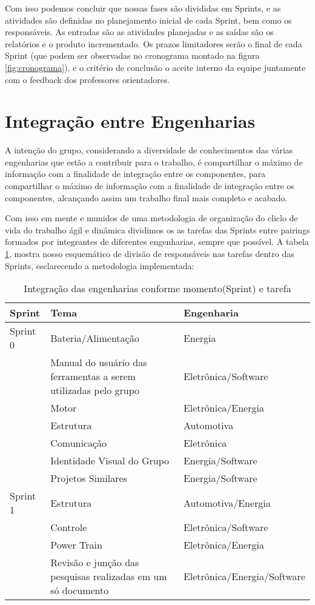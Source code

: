 Com isso podemos concluir que nossas fases são divididas em Sprints, e as atividades são definidas no planejamento inicial de cada Sprint, bem como os responsáveis. As entradas são as atividades planejadas e as saídas são os relatórios e o produto incrementado. Os prazos limitadores serão o final de cada Sprint (que podem ser observadas no cronograma montado na figura \ref{fig:cronograma}), e o critério de conclusão o aceite interno da equipe juntamente com o feedback dos professores orientadores.

\section{Integração entre Engenharias}

A intenção do grupo, considerando a diversidade de conhecimentos das várias engenharias que estão a contribuir para o trabalho, é compartilhar o máximo de informação com a finalidade de integração entre os componentes, para compartilhar o máximo de informação com a finalidade de integração entre os componentes, alcançando assim um trabalho final mais completo e acabado.

Com isso em mente e munidos de uma metodologia de organização do cliclo de vida do trabalho ágil e dinâmica dividimos os as tarefas das Sprints entre pairings formados por integrantes de diferentes engenharias, sempre que possível. A tabela \ref{tab:integracao}, mostra nosso esquemático de divisão de responsáveis nas tarefas dentro das Sprints, esclarecendo a metodologia implementada:


\begin{table}[]
\centering
\caption{Integração das engenharias conforme momento(Sprint) e tarefa}
\begin{tabular}{|p{2cm}|p{6cm}|p{5cm}|}
\hline
Sprint & Tema & Engenharia \\ \hline
Sprint 0 & Bateria/Alimentação & Energia \\ \hline
 & Manual do usuário das ferramentas a serem utilizadas pelo grupo & Eletrônica/Software \\ \hline
 & Motor & Eletrônica/Energia \\ \hline
 & Estrutura & Automotiva \\ \hline
 & Comunicação & Eletrônica \\ \hline
 & Identidade Visual do Grupo & Energia/Software \\ \hline
 & Projetos Similares & Energia/Software \\ \hline
Sprint 1 & Estrutura & Automotiva/Energia \\ \hline
 & Controle & Eletrônica/Software \\ \hline
 & Power Train & Eletrônica/Energia \\ \hline
 & Revisão e junção das pesquisas realizadas em um só documento & Eletrônica/Energia/Software \\ \hline
\end{tabular}
\label{tab:integracao}
\end{table}

